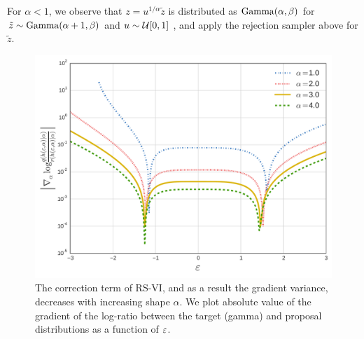For $\alpha < 1$, we observe that $z = u^{1/\alpha} \tilde z$ is distributed as $\operatorname*{Gamma}(\alpha,\beta)$ for $\tilde z \sim \operatorname*{Gamma}(\alpha+1,\beta)$ and ${u \sim \mathcal{U}[0,1]}$ \citep{stuart1962,devroye1986}, and apply the rejection sampler above for $\tilde z$.

\begin{figure}[t]
\includegraphics[width=0.9\columnwidth]{correction}
\vspace*{-10pt}
\caption{The correction term of \gls{RS-VI}, and as a result the gradient variance, decreases  with increasing shape $\alpha$. We plot absolute value of the gradient of the log-ratio between the target (gamma) and proposal distributions as a function of $\varepsilon$.%
}\label{fig:gammacorr}
\end{figure}


